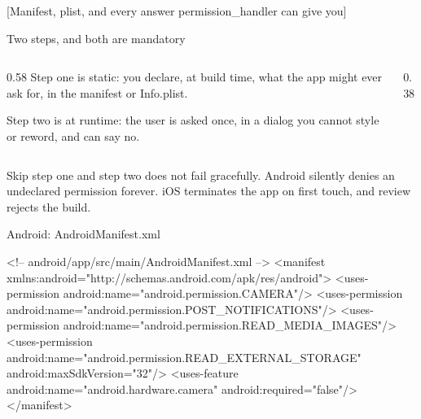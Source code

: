 \documentclass[10pt,aspectratio=169,t]{beamer}
\begin{document}
[Manifest, plist, and every answer permission\_handler can give you]

\begin{frame}[eyebrow=Permissions]{Two steps, and both are mandatory}
  \begin{columns}[T]
    \begin{column}{0.58\textwidth}
      Step one is static: you declare, at build time, what the app might ever ask for, in the manifest or Info.plist.

      Step two is at runtime: the user is asked once, in a dialog you cannot style or reword, and can say no.
    \end{column}
    \begin{column}{0.38\textwidth}
    \end{column}
  \end{columns}
  \begin{takeaway}{Skip step one and step two does not fail gracefully.}
    Android silently denies an undeclared permission forever. iOS terminates the app on first touch, and review rejects the build.
  \end{takeaway}
\end{frame}

\begin{frame}[fragile,eyebrow=Permissions]{Android: AndroidManifest.xml}
\begin{codeblock}[language=XML]
<!-- android/app/src/main/AndroidManifest.xml -->
<manifest xmlns:android="http://schemas.android.com/apk/res/android">
  <uses-permission android:name="android.permission.CAMERA"/>
  <uses-permission android:name="android.permission.POST_NOTIFICATIONS"/>
  <uses-permission android:name="android.permission.READ_MEDIA_IMAGES"/>
  <uses-permission android:name="android.permission.READ_EXTERNAL_STORAGE"
                    android:maxSdkVersion="32"/>
  <uses-feature android:name="android.hardware.camera"
                android:required="false"/>
</manifest>
\end{codeblock}
\end{frame}
\end{document}
